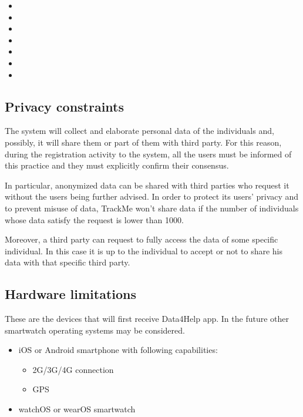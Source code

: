 \begin{itemize}


\item[] 
\item[]
\item[]
\item[]
\item[]
\item[]
\item[]
\end{itemize}




\subsection{Privacy constraints}
The system will collect and elaborate personal data of the individuals and, possibly, it will share them or part of them with third party.  For this reason, during the registration activity to the system, all the users must be informed of this practice and they must explicitly confirm their consensus.

In particular, anonymized data can be shared with third parties who request it without the users being further advised. In order to protect its users' privacy and to prevent misuse of data, TrackMe won't share data if the number of individuals whose data satisfy the request is lower than 1000.

Moreover, a third party can request to fully access the data of some specific individual. In this case it is up to the individual to accept or not to share his data with that specific third party.

\subsection{Hardware limitations}
These are the devices that will first receive Data4Help app. 
In the future other smartwatch operating systems may be considered.
\begin{itemize}
\item iOS or Android smartphone with following capabilities:
\begin{itemize}
\item 2G/3G/4G connection
\item GPS
\end{itemize}
\item watchOS or wearOS smartwatch
\end{itemize}

